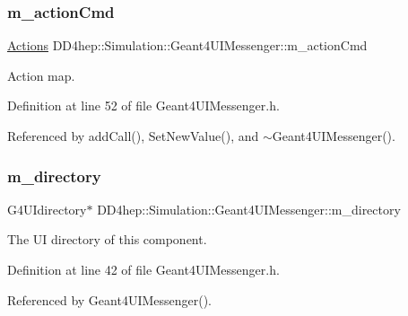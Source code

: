 \subsubsection{\texorpdfstring{m\+\_\+action\+Cmd}{m\_actionCmd}}
{\footnotesize\ttfamily \hyperlink{class_d_d4hep_1_1_simulation_1_1_geant4_u_i_messenger_a91b01eab1bb56af8661d2c99660211cd}{Actions} D\+D4hep\+::\+Simulation\+::\+Geant4\+U\+I\+Messenger\+::m\+\_\+action\+Cmd\hspace{0.3cm}{\ttfamily [protected]}}



Action map. 



Definition at line 52 of file Geant4\+U\+I\+Messenger.\+h.



Referenced by add\+Call(), Set\+New\+Value(), and $\sim$\+Geant4\+U\+I\+Messenger().

\hypertarget{class_d_d4hep_1_1_simulation_1_1_geant4_u_i_messenger_a6774d3061088d7b9391770e8dc74385e}{}\label{class_d_d4hep_1_1_simulation_1_1_geant4_u_i_messenger_a6774d3061088d7b9391770e8dc74385e} 
\subsubsection{\texorpdfstring{m\+\_\+directory}{m\_directory}}
{\footnotesize\ttfamily G4\+U\+Idirectory$\ast$ D\+D4hep\+::\+Simulation\+::\+Geant4\+U\+I\+Messenger\+::m\+\_\+directory\hspace{0.3cm}{\ttfamily [protected]}}



The UI directory of this component. 



Definition at line 42 of file Geant4\+U\+I\+Messenger.\+h.



Referenced by Geant4\+U\+I\+Messenger().

\hypertarget{class_d_d4hep_1_1_simulation_1_1_geant4_u_i_messenger_ab6322440ddac03e9b62f5560c7d11dbf}{}\label{class_d_d4hep_1_1_simulation_1_1_geant4_u_i_messenger_ab6322440ddac03e9b62f5560c7d11dbf} 
